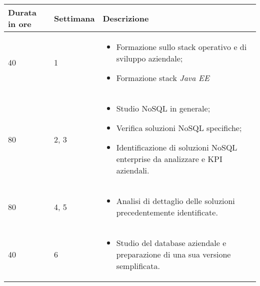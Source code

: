 \begin{table}
\begin{center}

        \renewcommand{\arraystretch}{1.5}
    
        \centering
        \begin{longtable}{| C{2.5cm} | C{2cm} | L{7.2cm} | }
            
            \hline
            
            \textbf{Durata in ore} & \textbf{Settimana} & \textbf{Descrizione} \\
            
            \hline
            
            40 & 1 &
            \begin{itemize}[leftmargin=*]
                \item Formazione sullo stack operativo e di sviluppo aziendale;
                \item Formazione stack \textit{Java EE}
            \end{itemize} \\
            
            \hline
            
            80 & 2, 3 &
            \begin{itemize}[leftmargin=*]
                \item Studio NoSQL in generale;
                \item Verifica soluzioni NoSQL specifiche;
                \item Identificazione di soluzioni NoSQL enterprise da analizzare e \gls{KPI} aziendali. 
            \end{itemize}  \\
            
            \hline
        
            80 & 4, 5 &
            \begin{itemize}[leftmargin=*]
                \item Analisi di dettaglio delle soluzioni precedentemente identificate. 
            \end{itemize}  \\
             
            \hline
            
            40 & 6 &
            \begin{itemize}[leftmargin=*]
                \item Studio del database aziendale e preparazione di una sua versione semplificata.
            \end{itemize}  \\


\end{longtable}
\end{center}
\end{table}
